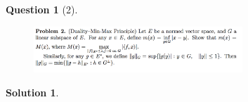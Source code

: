 \documentclass{article} %
\theoremstyle{quest}
\newtheorem*{question}{Question}
\newtheorem*{solution}{Solution}
\begin{document}
\newpage

\begin{question}[2]
\hfill
\begin{figure}[h!]
  \centering
    \includegraphics[width=0.7\textwidth]{funcA-h-e1-p2.png}
\end{figure}
\end{question}
\begin{solution} \hfill \\
\end{solution}

\newpage
\end{document}
